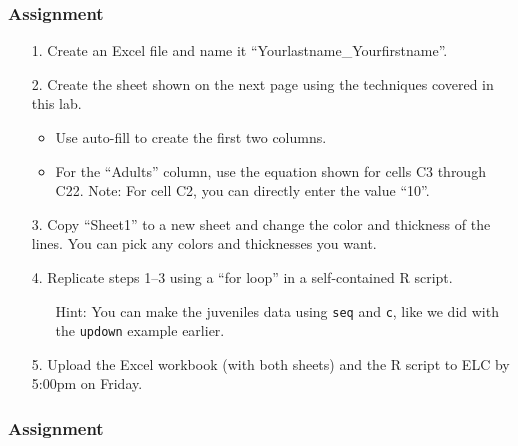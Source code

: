 \documentclass[color=usenames,dvipsnames]{beamer}\usepackage[]{graphicx}\usepackage[]{xcolor}
\newcommand{\inr}[1]{\colorbox{inlinecolor}{\texttt{#1}}}
\begin{document}
\begin{frame}
  \frametitle{Assignment}
  \small %
  \begin{enumerate}
    \item[1.] Create an Excel file and name it ``Yourlastname\_Yourfirstname''.
    \item[2.] Create the sheet shown on the next page using the techniques covered in this lab.
      \begin{itemize}
        \footnotesize
        \item Use auto-fill to create the first two columns.
        \item For the ``Adults'' column, use the equation shown
          for cells C3 through C22. Note: For cell C2, you can directly
          enter the value ``10''.
      \end{itemize}
    \item[3.] Copy ``Sheet1'' to a new sheet and change the color and
      thickness of the lines. You can pick any colors and thicknesses you want.
    \item[4.] Replicate steps 1--3 using a ``for
      loop'' in a self-contained {R} script.
      \begin{itemize}
      \item[] Hint: You can make the juveniles data using \inr{seq}
        and \inr{c}, like we did with the \inr{updown} example earlier.  
      \end{itemize}
    \item[5.] Upload the Excel workbook (with both sheets) and the
      R script to ELC by 5:00pm on Friday.
  \end{enumerate}
\end{frame}


\begin{frame}
  \frametitle{Assignment}
\end{frame}
\end{document}
